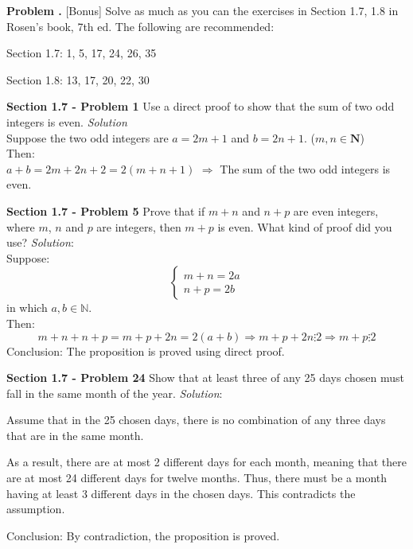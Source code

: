 \documentclass[10pt]{article}
\newcounter{problem}
\newcommand{\problem}{\textbf{\refstepcounter{problem}Problem \theproblem.} }
\begin{document}


\clearpage
\problem [Bonus] Solve as much as you can the exercises in Section 1.7, 1.8 in Rosen's
book, 7th ed. The following are recommended:
    \par Section 1.7: 1, 5, 17, 24, 26, 35
    \par Section 1.8: 13, 17, 20, 22, 30


\clearpage
\textbf{Section 1.7 - Problem 1} Use a direct proof to show that the sum of two odd integers is even.
\bigbreak
\textit{Solution} \\
\bigbreak
    Suppose the two odd integers are $a = 2m + 1$ and $b = 2n + 1$. ($m, n \in \textbf{N}$) \\
    Then: \\
    $a + b = 2m + 2n + 2 = 2(m + n + 1)$
    $\Rightarrow$ The sum of the two odd integers is even.


\clearpage
\textbf{Section 1.7 - Problem 5} Prove that if $m + n$ and $n + p$ are even integers, where $m$, $n$
and $p$ are integers, then $m + p$ is even. What kind of proof did you use?
\bigbreak
\textit{Solution}: \\
    Suppose:
    \begin{equation}
        \begin{cases}
            m + n = 2a \\
            n + p = 2b
        \end{cases}
    \end{equation}
    in which $a, b \in \mathbb{N}$. \\
    Then:
    \begin{equation}
        m + n + n + p = m + p + 2n = 2(a + b)
        \Rightarrow m + p + 2n \vdots 2
        \Rightarrow m + p \vdots 2
    \end{equation}
    Conclusion: The proposition is proved using direct proof.

\bigbreak

\clearpage
\textbf{Section 1.7 - Problem 24} Show that at least three of any 25 days chosen must
fall in the same month of the year.
\bigbreak
\textit{Solution}: \\

    \par Assume that in the 25 chosen days, there is no combination of any three days
    that are in the same month.
    \par As a result, there are at most 2 different days for each month, meaning that
    there are at most 24 different days for twelve months. Thus, there must be a
    month having at least 3 different days in the chosen days. This contradicts the
    assumption.
    \par Conclusion: By contradiction, the proposition is proved.
\end{document}
